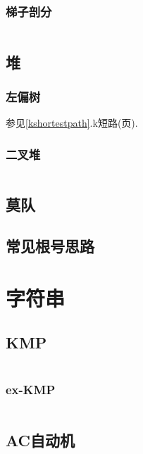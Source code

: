 \documentclass[a4paper, twoside]{article}
\begin{document}
\begin{multicols}{2}
				\subsubsection{梯子剖分}
					\inputminted{cpp}{../src/datastructure/梯子剖分.cpp}
			
			\subsection{堆}

				\subsubsection{左偏树}
					参见\ref{kshortestpath}.k短路(\pageref{kshortestpath}页).
				
				\subsubsection{二叉堆}
					\inputminted{cpp}{../src/datastructure/二叉堆.cpp}
			
			\subsection{莫队}
				
	
			\subsection{常见根号思路}
				

		\newpage
		\section{字符串}
			\subsection{KMP}
				\inputminted{cpp}{../src/string/KMP.cpp}
				
				\subsubsection{ex-KMP}
					\inputminted{cpp}{../src/string/exKMP.cpp}

			\subsection{AC自动机}
				\inputminted{cpp}{../src/string/AC自动机.cpp}


\end{multicols}
\end{document}
